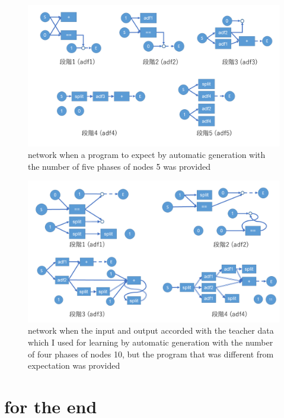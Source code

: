 \documentclass{article}
\begin{document}
\begin{figure}[t]
\begin{center}
\includegraphics[width=150mm]{out_net_p5n5.png}
\end{center}
\caption {network when a program to expect by automatic generation with the number of five phases of nodes 5 was provided}
\label{fig:out_net_p5n5}
\end{figure}
\begin{figure}[t]
\begin{center}
\includegraphics[width=150mm]{out_net_p4n10.png}
\end{center}
\caption {network when the input and output accorded with the teacher data which I used for learning by automatic generation with the number of four phases of nodes 10, but the program that was different from expectation was provided}
\label{fig:out_net_p4n10}
\end{figure}
\section {for the end}
\end{document}
